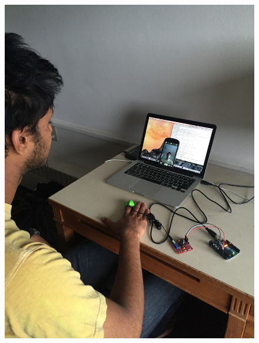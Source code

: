\documentclass[10pt,twocolumn,letterpaper]{article}
\begin{document}
\begin{figure}
\begin{center}
	\includegraphics[scale=0.045]{figures/setup}

\end{center}
\end{figure}
\end{document}
